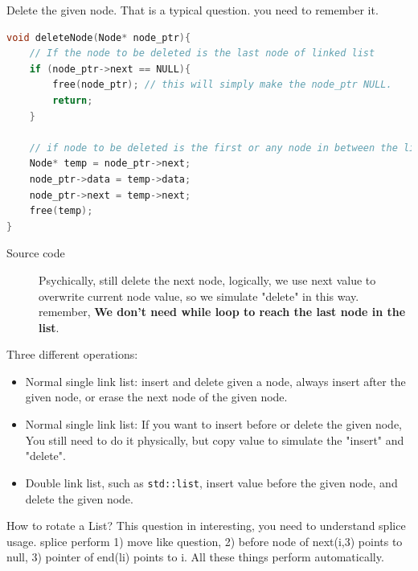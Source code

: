 \documentclass[a4paper,11pt,twoside]{book}
\begin{document}
	\par Delete the given node. That is a typical question. you need to remember it. 
\begin{lstlisting}[frame=single, language=c++]
void deleteNode(Node* node_ptr){
	// If the node to be deleted is the last node of linked list
	if (node_ptr->next == NULL){
		free(node_ptr); // this will simply make the node_ptr NULL.
		return;
	}
	
	// if node to be deleted is the first or any node in between the linked list.
	Node* temp = node_ptr->next;
	node_ptr->data = temp->data;
	node_ptr->next = temp->next;
	free(temp);
}
\end{lstlisting}
\begin{description}
	\item[Source code] Psychically, still delete the next node, logically, we use next value to overwrite current node value, so we simulate "delete" in this way. remember, \textbf{We don't need while loop to reach the last node in the list}. 
\end{description}


	\par Three different operations:
\begin{itemize}
	\item Normal single link list: insert and delete given a node, always insert after the given node, or erase the next node of the given node. 
	
	\item Normal single link list: If you want to insert before or delete the given node, You still need to do it physically, but copy value to simulate the "insert" and "delete". 
	
	\item Double link list, such as \texttt{std::list}, insert value before the given node, and delete the given node. 
\end{itemize}


	\par How to rotate a List? This question in interesting, you need to understand splice usage. splice perform 1) move like question, 2) before node of next(i,3) points to null, 3) pointer of end(li) points to i. All these things perform automatically. 
\end{document}
